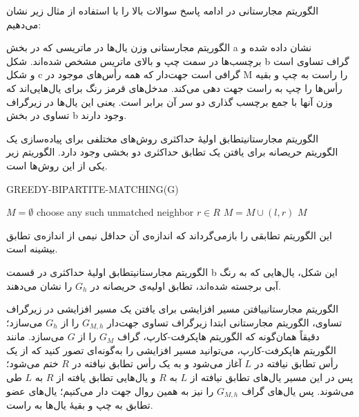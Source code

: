 \begin{itemframe}{الگوریتم مجارستانی}
\itm
در ادامه پاسخ سوالات بالا را با استفاده از مثال زیر نشان می‌دهیم:
\end{itemframe}


\begin{itemframe}{الگوریتم مجارستانی}
\itm
وزن یال‌ها در ماتریسی که در بخش a نشان داده شده و برچسب‌ها در سمت چپ و بالای ماتریس مشخص شده‌اند.
\itm
شکل b‌ گراف تساوی است و شکل c گرافی است جهت‌دار که همه رأس‌های موجود در M را راست به چپ و بقیه رأس‌ها را چپ به راست جهت دهی می‌کند.
\itm
مدخل‌های قرمز رنگ برای یال‌هایی‌اند که وزن آنها با جمع برچسب گذاری دو سر آن برابر است.
یعنی این یال‌ها در زیرگراف تساوی در بخش b وجود دارند.
\end{itemframe}


\begin{itemframe-s}{الگوریتم مجارستانی}{تطابق اولیهٔ حداکثری}
\itm
روش‌های مختلفی برای پیاده‌سازی یک الگوریتم حریصانه برای یافتن یک تطابق حداکثر‌ی دو بخشی وجود دارد. الگوریتم زیر یکی از این روش‌ها است.
\begin{algorithm}[H]\alglr
  \caption{GREEDY-BIPARTITE-MATCHING(G)}
  \begin{algorithmic}[1]
    \State $M = \emptyset$
        \State choose any such unmatched neighbor $r \in R$
        \State $M = M \cup {(l, r)}$
      \EndIf
    \EndFor
    \State \Return $M$
  \end{algorithmic}
\end{algorithm}
\itm
این الگوریتم تطابقی را بازمی‌گرداند که اندازه‌ی آن حداقل نیمی از اندازه‌ی تطابق بیشینه است.
\end{itemframe-s}


\begin{itemframe-s}{الگوریتم مجارستانی}{تطابق اولیهٔ حداکثری}
\itm
در قسمت b این شکل، یال‌هایی که به رنگ آبی برجسته شده‌اند، تطابق اولیه‌ی حریصانه در $G_h$ را نشان می‌دهند.
\end{itemframe-s}


\begin{itemframe-s}{الگوریتم مجارستانی}{یافتن مسیر افزایشی}
\itm
برای یافتن یک مسیر افزایشی در زیرگراف تساوی، الگوریتم مجارستانی ابتدا زیرگراف تساوی جهت‌دار $G_{M,h}$ را از $G_h$ می‌سازد؛ دقیقاً همان‌گونه که الگوریتم هاپکرفت-کارپ، گراف $G_M$ را از $G$ می‌سازد.
\itm
مانند الگوریتم هاپکرفت-کارپ، می‌توانید مسیر افزایشی را به‌گونه‌ای تصور کنید که از یک رأس تطابق نیافته در $L$ آغاز می‌شود و به یک رأس تطابق نیافته در $R$ ختم می‌شود؛ پس در این مسیر یال‌های تطابق نیافته از $L$ به $R$ و یال‌هایی تطابق یافته از $R$ به $L$ طی می‌شوند.
\itm
پس یال‌های گراف $G_{M,h}$ را نیز به همین روال جهت دار می‌کنیم؛ یال‌های عضو تطابق به چپ و بقیهٔ یال‌ها به راست.
\end{itemframe-s}


